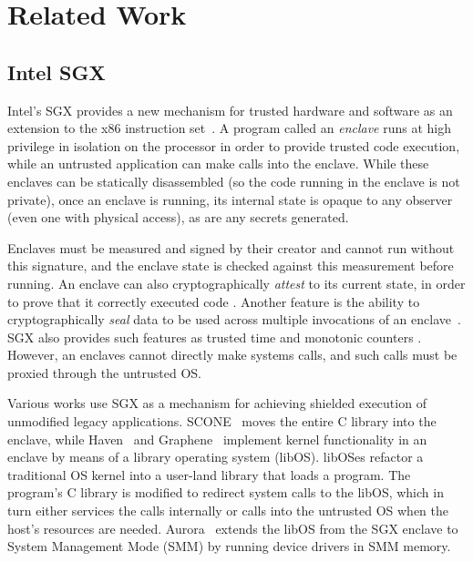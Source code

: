 \section{Related Work}
\label{sec:related}

\subsection{Intel SGX}

Intel's SGX provides a new mechanism for trusted hardware and software as an
extension to the x86 instruction set~\cite{sgx, mckeen2013innovative}.  
%
A program called an \textit{enclave} runs at high privilege in isolation on the
processor in order to provide trusted code execution, while an untrusted
application can make calls into the enclave.
%
While these enclaves can be statically disassembled (so the code running in the
enclave is not private), once an enclave is running, its internal state
is opaque to any observer (even one with physical access), as are any secrets
generated.  


Enclaves must be measured and signed by their creator and cannot run without
this signature, and the enclave state is checked against this measurement
before running.  
%
An enclave can also cryptographically \textit{attest} to its current state, in
order to prove that it correctly executed code \cite{sgx_provisioning,
anati2013innovative}.  
%
Another feature is the ability to cryptographically \textit{seal} data to be
used across multiple invocations of an enclave~\cite{anati2013innovative,
sgx_sealing}.  
%
SGX also provides such features as trusted time and monotonic counters
\cite{sgx-linux-sdk,sgx-trusted-time}.  
%
However, an enclaves cannot directly make systems calls, and such calls must be
proxied through the untrusted OS\@.


%
Various works use SGX as a mechanism for achieving shielded execution of
unmodified legacy applications.
%
SCONE~\cite{scone} moves the entire C library into the enclave, while
Haven~\cite{haven} and Graphene~\cite{graphene} 
implement kernel functionality in an enclave by means of a library operating
system (libOS).
%
libOSes refactor a traditional OS kernel into a user-land library that loads a
program.
%
The program's C library is modified to redirect system calls to the libOS, which
in turn either services the calls internally or calls into the untrusted OS
when the host's resources are needed.
%
Aurora~\cite{liang2018aurora} extends the libOS from the SGX enclave to System
Management Mode (SMM) by running device drivers in SMM memory.


